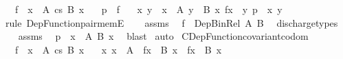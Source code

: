 \begin{isabellebody}
\ \ \ {\isachardoublequoteopen}f\ {\isacharcolon}{\kern0pt}\ {\isacharparenleft}{\kern0pt}x\ {\isacharcolon}{\kern0pt}\ A{\isacharparenright}{\kern0pt}\ {\isasymrightarrow}cs\ B\ x{\isachardoublequoteclose}\isanewline
\ \ \ {\isachardoublequoteopen}p\ {\isasymin}\ f{\isachardoublequoteclose}\isanewline
\ \ \ x\ y\ \ {\isachardoublequoteopen}x\ {\isacharcolon}{\kern0pt}\ A{\isachardoublequoteclose}\ {\isachardoublequoteopen}y\ {\isacharcolon}{\kern0pt}\ B\ x{\isachardoublequoteclose}\ {\isachardoublequoteopen}f{\isacharbackquote}{\kern0pt}x\ {\isacharequal}{\kern0pt}\ y{\isachardoublequoteclose}\ {\isachardoublequoteopen}p\ {\isacharequal}{\kern0pt}\ {\isasymlangle}x{\isacharcomma}{\kern0pt}\ y{\isasymrangle}{\isachardoublequoteclose}\isanewline
%
\isadelimproof
%
\endisadelimproof
%
\isatagproof
{}\isamarkupfalse%
\ {\isacharparenleft}{\kern0pt}rule\ Dep{\isacharunderscore}{\kern0pt}Function{\isacharunderscore}{\kern0pt}pair{\isacharunderscore}{\kern0pt}memE{\isacharparenright}{\kern0pt}\isanewline
\ \ \isamarkupfalse%
\ assms\ \isamarkupfalse%
\ {\isachardoublequoteopen}f\ {\isacharcolon}{\kern0pt}\ Dep{\isacharunderscore}{\kern0pt}Bin{\isacharunderscore}{\kern0pt}Rel\ A\ B{\isachardoublequoteclose}\ \isamarkupfalse%
\ discharge{\isacharunderscore}{\kern0pt}types\isanewline
\ \ \isamarkupfalse%
\ assms\ \isamarkupfalse%
\ {\isachardoublequoteopen}p\ {\isacharcolon}{\kern0pt}\ {\isasymSum}x\ {\isacharcolon}{\kern0pt}\ A{\isachardot}{\kern0pt}\ {\isacharparenleft}{\kern0pt}B\ x{\isacharparenright}{\kern0pt}{\isachardoublequoteclose}\ \isamarkupfalse%
\ blast\isanewline
{}\isamarkupfalse%
\ auto%
\endisatagproof
{\isafoldproof}%
%
\isadelimproof
\isanewline
%
\endisadelimproof
\isanewline
{}\isamarkupfalse%
\ CDep{\isacharunderscore}{\kern0pt}Function{\isacharunderscore}{\kern0pt}covariant{\isacharunderscore}{\kern0pt}codom{\isacharcolon}{\kern0pt}\isanewline
\ \ \ {\isachardoublequoteopen}f\ {\isacharcolon}{\kern0pt}\ {\isacharparenleft}{\kern0pt}x\ {\isacharcolon}{\kern0pt}\ A{\isacharparenright}{\kern0pt}\ {\isasymrightarrow}cs\ B\ x{\isachardoublequoteclose}\isanewline
\ \ \ {\isachardoublequoteopen}{\isasymAnd}x{\isachardot}{\kern0pt}\ x\ {\isacharcolon}{\kern0pt}\ A\ {\isasymLongrightarrow}\ f{\isacharbackquote}{\kern0pt}x\ {\isacharcolon}{\kern0pt}\ B\ x\ {\isasymLongrightarrow}\ f{\isacharbackquote}{\kern0pt}x\ {\isacharcolon}{\kern0pt}\ B{\isacharprime}{\kern0pt}\ x{\isachardoublequoteclose}\isanewline

\end{isabellebody}
